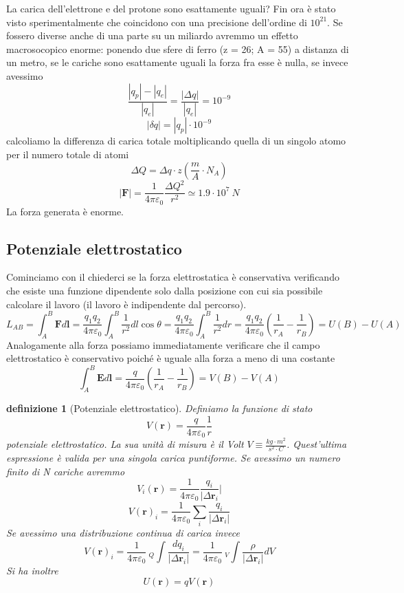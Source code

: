 \documentclass[10pt,a4paper]{article}
\newtheorem{definizione}{definizione}
\begin{document}
La carica dell'elettrone e del protone sono esattamente uguali? Fin ora è stato visto sperimentalmente che coincidono con una precisione dell'ordine di \(10^{21}\). Se fossero diverse anche di una parte su un miliardo avremmo un effetto macrosocopico enorme: ponendo due sfere di ferro (z = 26; A = 55) a distanza di un metro, se le cariche sono esattamente uguali la forza fra esse è nulla, se invece avessimo 
\[\frac{|q_p|-|q_e|}{|q_e|} = \frac{|\Delta q|}{|q_e|}=10^{-9}\]
\[|\delta q| = |q_p|\cdot10^{-9}\]
calcoliamo la differenza di carica totale moltiplicando quella di un singolo atomo per il numero totale di atomi
\[\Delta Q = \Delta q\cdot z \left(\frac{m}{A}\cdot N_A\right) \]
\[|\mathbf{F}|=\frac{1}{4\pi\varepsilon_0}\frac{\Delta Q^2}{r^2}\simeq 1.9\cdot10^{7}\ N\]
La forza generata è enorme. 
\subsection{Potenziale elettrostatico}
Cominciamo con il chiederci se la forza elettrostatica è conservativa verificando che esiste una funzione dipendente solo dalla posizione con cui sia possibile calcolare il lavoro (il lavoro è indipendente dal percorso). 
\[L_{AB} = \int_{A}^{B}\mathbf{F}d\mathbf{l}= \frac{q_1q_2}{4\pi\varepsilon_0}\int_{A}^{B}\frac{1}{r^2}dl\cos\theta=\frac{q_1q_2}{4\pi\varepsilon_0}\int_{A}^{B}\frac{1}{r^2}dr=\frac{q_1q_2}{4\pi\varepsilon_0}\left(\frac{1}{r_A}-\frac{1}{r_B}\right)=U(B)-U(A)\]
Analogamente alla forza possiamo immediatamente verificare che il campo elettrostatico è conservativo poiché è uguale alla forza a meno di una costante
\[\int_{A}^{B}\mathbf{E}d\mathbf{l}=\frac{q}{4\pi\varepsilon_0}\left(\frac{1}{r_A}-\frac{1}{r_B}\right)=V(B)-V(A)\]
\begin{definizione}[Potenziale elettrostatico]
Definiamo la funzione di stato 
\[V(\mathbf{r}) = \frac{q}{4\pi\varepsilon_0}\frac{1}{r}\]
potenziale elettrostatico. La sua unità di misura è il Volt $V \equiv \frac{kg\cdot m^2}{s^2\cdot C}$.  Quest'ultima espressione è valida per una singola carica puntiforme. Se avessimo un numero finito di N cariche avremmo
\[V_i(\mathbf{r}) = \frac{1}{4\pi\varepsilon_0}\frac{q_i}{|\Delta \mathbf{r}_i}|\]
\[V(\mathbf{r})_i= \frac{1}{4\pi\varepsilon_0}\sum_{i}\frac{q_i}{|\Delta \mathbf{r}_i|}\]
Se avessimo una distribuzione continua di carica invece
\[V(\mathbf{r})_i= \frac{1}{4\pi\varepsilon_0}\ _Q\int\frac{d q_i}{|\Delta \mathbf{r}_i|} =  \frac{1}{4\pi\varepsilon_0}\ _V\int\frac{\rho}{|\Delta \mathbf{r}_i|}dV\]
Si ha inoltre 
\[U(\mathbf{r})=qV(\mathbf{r})\]
\end{definizione}
\end{document}
